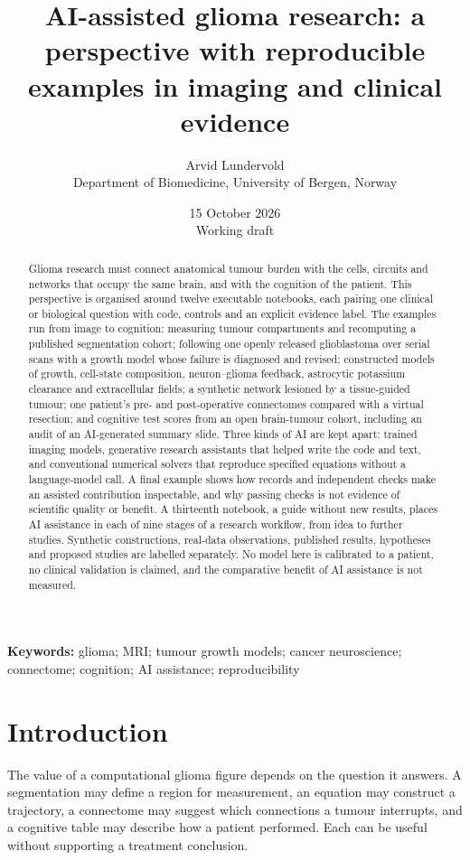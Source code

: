 \documentclass[11pt,a4paper]{article}
\title{AI-assisted glioma research: a perspective with reproducible examples
in imaging and clinical evidence}
\author{Arvid Lundervold\\
\small Department of Biomedicine, University of Bergen, Norway}
\date{15 October 2026\\\small Working draft}
\begin{document}
\maketitle

\begin{abstract}
Glioma research must connect anatomical tumour burden with the cells, circuits
and networks that occupy the same brain, and with the cognition of the patient.
This perspective is organised around twelve executable notebooks, each pairing
one clinical or biological question with code, controls and an explicit
evidence label. The examples run from image to cognition: measuring tumour
compartments and recomputing a published segmentation cohort; following one
openly released glioblastoma over serial scans with a growth model whose
failure is diagnosed and revised; constructed models of growth, cell-state
composition, neuron--glioma feedback, astrocytic potassium clearance and
extracellular fields; a synthetic network lesioned by a tissue-guided tumour;
one patient's pre- and post-operative connectomes compared with a virtual
resection; and cognitive test scores from an open brain-tumour cohort,
including an audit of an AI-generated summary slide. Three kinds of AI are kept
apart: trained imaging models, generative research assistants that helped
write the code and text, and conventional numerical solvers that reproduce
specified equations without a language-model call. A final example shows how
records and independent checks make an assisted contribution inspectable, and
why passing checks is not evidence of scientific quality or benefit. A
thirteenth notebook, a guide without new results, places AI assistance in each
of nine stages of a research workflow, from idea to further studies. Synthetic
constructions, real-data observations, published results, hypotheses and
proposed studies are labelled separately. No model here is calibrated to a
patient, no clinical validation is claimed, and the comparative benefit of AI
assistance is not measured.
\end{abstract}

\noindent\textbf{Keywords:} glioma; MRI; tumour growth models; cancer
neuroscience; connectome; cognition; AI assistance; reproducibility

\section{Introduction}

The value of a computational glioma figure depends on the question it answers.
A segmentation may define a region for measurement, an equation may construct
a trajectory, a connectome may suggest which connections a tumour interrupts,
and a cognitive table may describe how a patient performed. Each can be useful
without supporting a treatment conclusion.
\end{document}
